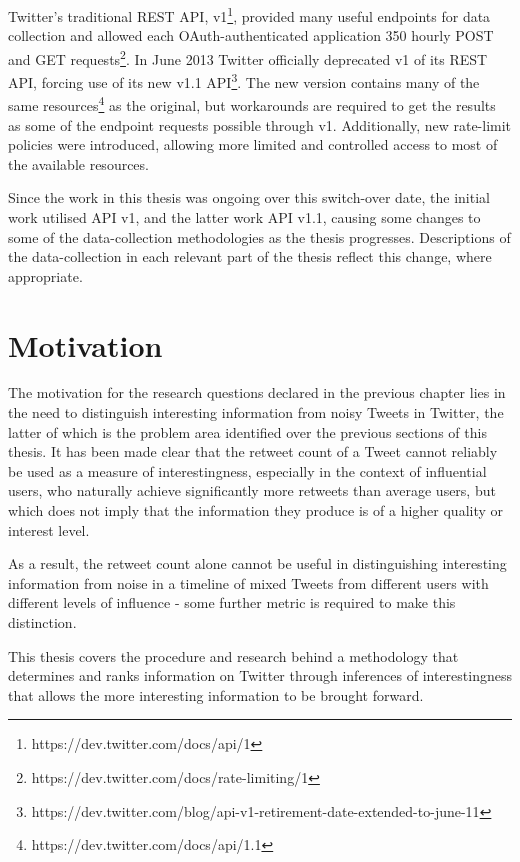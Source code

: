 Twitter's traditional REST API, v1\footnote{https://dev.twitter.com/docs/api/1}, provided many useful endpoints for data collection and allowed each OAuth-authenticated application 350 hourly POST and GET requests\footnote{https://dev.twitter.com/docs/rate-limiting/1}. In June 2013 Twitter officially deprecated v1 of its REST API, forcing use of its new v1.1 API\footnote{https://dev.twitter.com/blog/api-v1-retirement-date-extended-to-june-11}. The new version contains many of the same resources\footnote{https://dev.twitter.com/docs/api/1.1} as the original, but workarounds are required to get the results as some of the endpoint requests possible through v1. Additionally, new rate-limit policies were introduced, allowing more limited and controlled access to most of the available resources.

Since the work in this thesis was ongoing over this switch-over date, the initial work utilised API v1, and the latter work API v1.1, causing some changes to some of the data-collection methodologies as the thesis progresses. Descriptions of the data-collection in each relevant part of the thesis reflect this change, where appropriate.


\section{Motivation}
The motivation for the research questions declared in the previous chapter lies in the need to distinguish interesting information from noisy Tweets in Twitter, the latter of which is the problem area identified over the previous sections of this thesis. It has been made clear that the retweet count of a Tweet cannot reliably be used as a measure of interestingness, especially in the context of influential users, who naturally achieve significantly more retweets than average users, but which does not imply that the information they produce is of a higher quality or interest level.

As a result, the retweet count alone cannot be useful in distinguishing interesting information from noise in a timeline of mixed Tweets from different users with different levels of influence - some further metric is required to make this distinction. 

This thesis covers the procedure and research behind a methodology that determines and ranks information on Twitter through inferences of interestingness that allows the more interesting information to be brought forward. 
